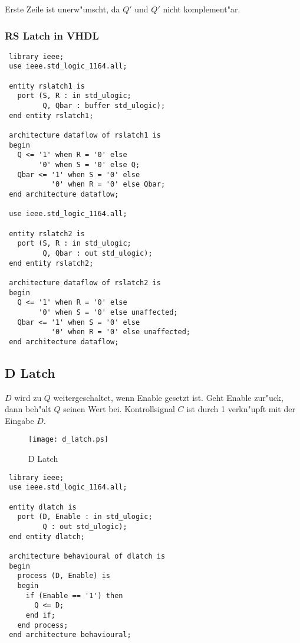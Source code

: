 \documentclass[german, 10pt, a4paper, twocolumn]{scrartcl}
\theoremstyle{definition}
\begin{document}
Erste Zeile ist unerw"unscht, da $Q'$ und $\overline{Q}'$ nicht komplement"ar.

\subsubsection{RS Latch in VHDL}

\begin{verbatim}
 library ieee;
 use ieee.std_logic_1164.all;

 entity rslatch1 is
   port (S, R : in std_ulogic;
         Q, Qbar : buffer std_ulogic);
 end entity rslatch1;

 architecture dataflow of rslatch1 is
 begin
   Q <= '1' when R = '0' else
        '0' when S = '0' else Q;
   Qbar <= '1' when S = '0' else
           '0' when R = '0' else Qbar;
 end architecture dataflow;

 use ieee.std_logic_1164.all;

 entity rslatch2 is
   port (S, R : in std_ulogic;
         Q, Qbar : out std_ulogic);
 end entity rslatch2;

 architecture dataflow of rslatch2 is
 begin
   Q <= '1' when R = '0' else
        '0' when S = '0' else unaffected;
   Qbar <= '1' when S = '0' else
           '0' when R = '0' else unaffected;
 end architecture dataflow;
\end{verbatim}


\subsection{D Latch}

$D$ wird zu $Q$ weitergeschaltet, wenn Enable gesetzt ist. Geht Enable zur"uck, dann beh"alt $Q$ seinen Wert bei. Kontrollsignal $C$
 ist durch 1 verkn"upft mit der Eingabe $D$.

\begin{figure}[hbt]
 \begin{center}
 	\texttt{[image: d\_latch.ps]}
 \end{center}
 \caption{D Latch}
 \label{d_latch}
\end{figure}

\begin{verbatim}
 library ieee;
 use ieee.std_logic_1164.all;

 entity dlatch is
   port (D, Enable : in std_ulogic;
         Q : out std_ulogic);
 end entity dlatch;

 architecture behavioural of dlatch is
 begin
   process (D, Enable) is
   begin
     if (Enable == '1') then
       Q <= D;
     end if;
   end process;
 end architecture behavioural;
\end{verbatim}
\end{document}
